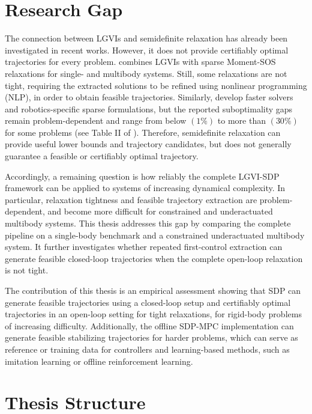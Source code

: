 \section{Research Gap}
\label{sec:introduction_research_gap}

The connection between LGVIs and semidefinite relaxation has already
been investigated in recent works. However, it does not provide certifiably optimal trajectories for every
problem. \cite{Sangli2025} combines LGVIs with sparse Moment-SOS relaxations for
single- and multibody systems. Still, some relaxations are not
tight, requiring the extracted solutions to be refined using nonlinear programming (NLP),
in order to obtain feasible trajectories.
Similarly, \cite{Kang_2026Fast,Kang_2025Global} develop faster solvers and robotics-specific sparse
formulations, but the reported suboptimality
gaps remain problem-dependent and range from below $(1\%)$ to more than
$(30\%)$ for some problems (see Table II of \cite{Kang_2025Global}). Therefore, semidefinite relaxation can provide useful lower bounds and
trajectory candidates, but does not generally guarantee a feasible or certifiably
optimal trajectory.

Accordingly, a remaining question is how reliably the complete LGVI-SDP framework can be applied to systems of 
increasing dynamical complexity.
In particular,
relaxation tightness and feasible trajectory extraction are problem-dependent, and
become more difficult for constrained and underactuated multibody systems. 
This thesis addresses this gap by comparing the complete
pipeline on a single-body benchmark and a constrained underactuated multibody
system. It further investigates whether repeated first-control extraction can
generate feasible closed-loop trajectories when the complete open-loop relaxation
is not tight.

The contribution of this thesis is an empirical assessment showing that SDP can generate feasible trajectories 
using a closed-loop setup and certifiably optimal trajectories in an open-loop setting
for tight relaxations, for rigid-body problems of increasing 
difficulty. Additionally, the offline SDP-MPC implementation can generate feasible stabilizing 
trajectories for harder problems, which can serve as reference or training data for 
controllers and learning-based methods, such as imitation learning or offline reinforcement 
learning.

\section{Thesis Structure}
\label{sec:introduction_structure}

